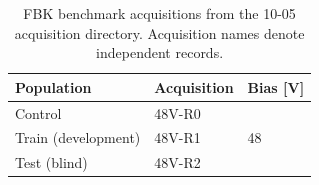 \begin{table}[H]
\centering
\small
\begin{tabular}{lll}
\toprule
Population & Acquisition & Bias [V] \\
\midrule
Control & 48V-R0 & \multirow{3}{*}{48} \\
Train (development) & 48V-R1 &  \\
Test (blind) & 48V-R2 &  \\
\bottomrule
\end{tabular}
\caption{FBK benchmark acquisitions from the 10-05 acquisition directory. Acquisition names denote independent records.}
\label{tab:fbk-acquisitions}
\end{table}
